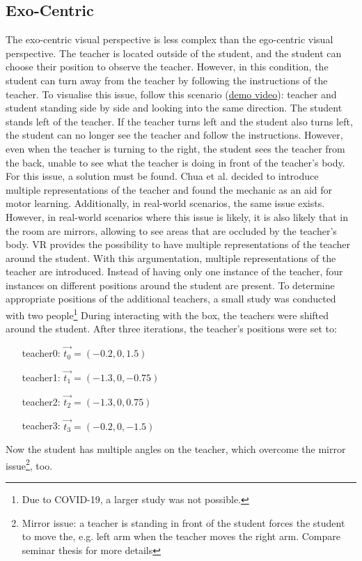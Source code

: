 \subsection{Exo-Centric}
The exo-centric visual perspective is less complex than the ego-centric visual perspective. The teacher is located outside of the student, and the student can choose their position to observe the teacher. However, in this condition, the student can turn away from the teacher by following the instructions of the teacher. To visualise this issue, follow this scenario (\href{https://www.youtube.com/watch?v=mRG22RBXKTM&feature=youtu.be}{demo video}): teacher and student standing side by side and looking into the same direction. The student stands left of the teacher. If the teacher turns left and the student also turns left, the student can no longer see the teacher and follow the instructions. However, even when the teacher is turning to the right, the student sees the teacher from the back, unable to see what the teacher is doing in front of the teacher's body. For this issue, a solution must be found. Chua et al. \cite{Chua} decided to introduce multiple representations of the teacher and found the mechanic as an aid for motor learning. Additionally, in real-world scenarios, the same issue exists. However, in real-world scenarios where this issue is likely, it is also likely that in the room are mirrors, allowing to see areas that are occluded by the teacher's body.  VR provides the possibility to have multiple representations of the teacher around the student. With this argumentation, multiple representations of the teacher are introduced. Instead of having only one instance of the teacher, four instances on different positions around the student are present. To determine appropriate positions of the additional teachers, a small study was conducted with two people\footnote{Due to COVID-19, a larger study was not possible.} During interacting with the box, the teachers were shifted around the student. After three iterations, the teacher's positions were set to:
\begin{itemize}
	\centering
	\item[teacher0:] $\vec{t_0} = (-0.2,0,1.5)$
	\item[teacher1:] $\vec{t_1} = (-1.3,0,-0.75)$
	\item[teacher2:] $\vec{t_2} = (-1.3,0,0.75)$
	\item[teacher3:] $\vec{t_3} = (-0.2,0,-1.5)$
\end{itemize}

Now the student has multiple angles on the teacher, which overcome the mirror issue\footnote{Mirror issue: a teacher is standing in front of the student forces the student to move the, e.g. left arm when the teacher moves the right arm. Compare seminar thesis for more details}, too.
